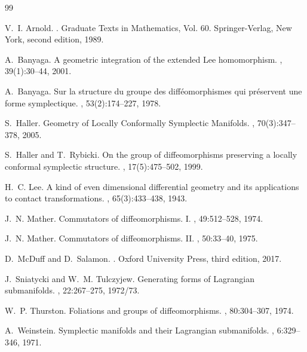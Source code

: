 \documentclass[11pt,a4paper]{amsart}
\theoremstyle{definition}
\theoremstyle{remark}
\begin{document}
	\begin{thebibliography}{99}
		
		V.~I. Arnold.
		.
		\newblock Graduate Texts in Mathematics, Vol. 60. Springer-Verlag, New York, second edition, 1989.
		
		A.~Banyaga.
		\newblock A geometric integration of the extended Lee homomorphism.
		, 39(1):30--44, 2001.
		
		A.~Banyaga.
		\newblock Sur la structure du groupe des diff{\'e}omorphismes qui pr{\'e}servent une forme symplectique.
		, 53(2):174--227, 1978.
		
		S.~Haller.
		\newblock Geometry of Locally Conformally Symplectic Manifolds.
		, 70(3):347--378, 2005.
		
		S.~Haller and T.~Rybicki.
		\newblock On the group of diffeomorphisms preserving a locally conformal symplectic structure.
		, 17(5):475--502, 1999.
		
		H.~C. Lee.
		\newblock A kind of even dimensional differential geometry and its applications to contact transformations.
		, 65(3):433--438, 1943.
		
		J.~N. Mather.
		\newblock Commutators of diffeomorphisms. I.
		, 49:512--528, 1974.
		
		J.~N. Mather.
		\newblock Commutators of diffeomorphisms. II.
		, 50:33--40, 1975.
		
		D.~McDuff and D.~Salamon.
		.
		\newblock Oxford University Press, third edition, 2017.
		
		J.~Sniatycki and W.~M. Tulczyjew.
		\newblock Generating forms of Lagrangian submanifolds.
		, 22:267--275, 1972/73.
		
		W.~P. Thurston.
		\newblock Foliations and groups of diffeomorphisms.
		, 80:304--307, 1974.
		
		A.~Weinstein.
		\newblock Symplectic manifolds and their Lagrangian submanifolds.
		, 6:329--346, 1971.
		
	\end{thebibliography}
\end{document}
